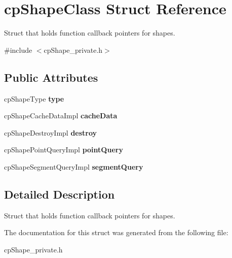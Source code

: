 \hypertarget{structcp_shape_class}{}\section{cp\+Shape\+Class Struct Reference}
\label{structcp_shape_class}


Struct that holds function callback pointers for shapes.  




{\ttfamily \#include $<$cp\+Shape\+\_\+private.\+h$>$}

\subsection*{Public Attributes}
\begin{DoxyCompactItemize}
\item 
\hypertarget{structcp_shape_class_a9715799d3a01fbd59636ddff5c8db804}{}cp\+Shape\+Type {\bfseries type}\label{structcp_shape_class_a9715799d3a01fbd59636ddff5c8db804}

\item 
\hypertarget{structcp_shape_class_a706a7db5c2ea333f48d95c873429c516}{}cp\+Shape\+Cache\+Data\+Impl {\bfseries cache\+Data}\label{structcp_shape_class_a706a7db5c2ea333f48d95c873429c516}

\item 
\hypertarget{structcp_shape_class_a8b4a3c49681c00bba3eb47dff352d833}{}cp\+Shape\+Destroy\+Impl {\bfseries destroy}\label{structcp_shape_class_a8b4a3c49681c00bba3eb47dff352d833}

\item 
\hypertarget{structcp_shape_class_ae24887377912c675605975d18849de79}{}cp\+Shape\+Point\+Query\+Impl {\bfseries point\+Query}\label{structcp_shape_class_ae24887377912c675605975d18849de79}

\item 
\hypertarget{structcp_shape_class_ac20debbb5fbd07165d38185e7f4c8989}{}cp\+Shape\+Segment\+Query\+Impl {\bfseries segment\+Query}\label{structcp_shape_class_ac20debbb5fbd07165d38185e7f4c8989}

\end{DoxyCompactItemize}


\subsection{Detailed Description}
Struct that holds function callback pointers for shapes. 

The documentation for this struct was generated from the following file\+:\begin{DoxyCompactItemize}
\item 
cp\+Shape\+\_\+private.\+h\end{DoxyCompactItemize}
